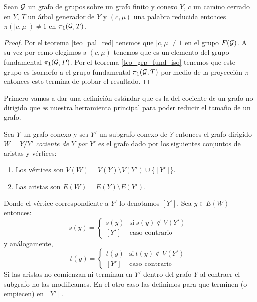 \documentclass[tesis.tex]{subfiles}
\begin{document}
\begin{coro}\label{coro_pal_red_3}
	Sean ${\cal G}$ un grafo de grupos sobre un grafo finito y conexo $Y$, $c$ un camino cerrado en $Y$, $T$ un árbol generador de $Y$ y $(c, \mu)$ una palabra reducida entonces $\pi(|c,\mu|) \neq 1$ en $\pi_1({\cal G}, T)$. 
\end{coro}
\begin{proof}
	Por el teorema \ref{teo_pal_red} tenemos que $|c,\mu| \neq 1$ en el grupo $F({\cal G})$.
	A su vez por como elegimos a $(c, \mu)$ tenemos que es un elemento del grupo fundamental $\pi_1({\cal G}, P)$.
	Por el teorema \ref{teo_grp_fund_iso} tenemos que este grupo es isomorfo a el grupo fundamental $\pi_1({\cal G}, T)$ por medio de la proyección $\pi$ entonces esto termina de probar el resultado.
\end{proof}





Primero vamos a dar una definición estándar que es la del cociente de un grafo no dirigido que es nuestra herramienta principal para poder reducir el tamaño de un grafo.

\begin{deff}
	Sea $Y$ un grafo conexo y sea $Y'$ un subgrafo conexo de $Y$ entonces
	el grafo dirigido $W = Y/Y'$ \emph{cociente de $Y$ por $Y'$} es el grafo dado por los siguientes conjuntos de aristas y vértices:
	
	\begin{enumerate}
		\item Los vértices son $V(W)= V(Y) \setminus V(Y') \cup \{ [Y'] \}$.
		\item Las aristas son $E(W) = E(Y) \setminus E(Y')$.
	\end{enumerate}
	Donde el vértice correspondiente a $Y'$ lo denotamos $[Y']$. 
	Sea $y \in E(W)$ entonces:
	\begin{equation*}
		s(y) = 
		\begin{cases}
			s(y)  & \text{si} \ s(y) \notin V(Y') \\ 
			[Y'] & \text{caso contrario}
		\end{cases}
	\end{equation*}
	y análogamente,
	\begin{equation*}
		t(y) = 
		\begin{cases}
			t(y)  & \text{si} \ t(y) \notin V(Y') \\ 
			[Y'] & \text{caso contrario}
		\end{cases}
	\end{equation*}
	Si las aristas no comienzan ni terminan en $Y'$ dentro del grafo $Y$ al contraer el subgrafo no las modificamos. 
	En el otro caso las definimos para que terminen (o empiecen) en $[Y']$. 
	
\end{deff}
\end{document}
